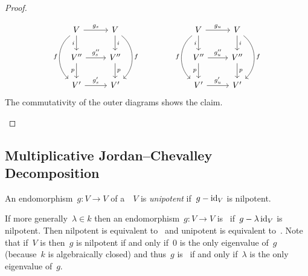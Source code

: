\begin{proof}
\begin{enumerate}
\[\begin{tikzcd}
            V
            \arrow{r}[above]{g_s}
            \arrow{d}[left]{i}
            \arrow[bend right = 50]{dd}[left]{f}
          & V
            \arrow{d}[right]{i}
            \arrow[bend left = 50]{dd}[right]{f}
          \\
            V''
            \arrow{r}[above]{g''_s}
            \arrow{d}[left]{p}
          & V''
            \arrow{d}[right]{p}
          \\
            V'
            \arrow{r}[above]{g'_s}
          & V'
        \end{tikzcd}
        \qquad
        \qquad
        \begin{tikzcd}
            V
            \arrow{r}[above]{g_u}
            \arrow{d}[left]{i}
            \arrow[bend right = 50]{dd}[left]{f}
          & V
            \arrow{d}[right]{i}
            \arrow[bend left = 50]{dd}[right]{f}
          \\
            V''
            \arrow{r}[above]{g''_u}
            \arrow{d}[left]{p}
          & V''
            \arrow{d}[right]{p}
          \\
            V'
            \arrow{r}[above]{g'_u}
          & V'
        \end{tikzcd}
      \]
      The commutativity of the outer diagrams shows the claim.
    \qedhere
  \end{enumerate}
\end{proof}









\subsection{Multiplicative Jordan--Chevalley Decomposition}


\begin{definition}
  An endomorphism~$g \colon V \to V$ of a~{\kvs}~$V$ is \emph{unipotent} if~$g - \operatorname{id}_V$ is nilpotent.
\end{definition}


\begin{remark}
  If more generally~$\lambda \in k$ then an endomorphism~$g \colon V \to V$ is~\emph{} if~$g - \lambda \operatorname{id}_V$ is nilpotent.
  Then nilpotent is equivalent to~ and unipotent is equivalent to~.
  Note that if~$V$ is {\fd} then~$g$ is nilpotent if and only if~$0$ is the only eigenvalue of~$g$ (because~$k$ is algebraically closed) and thus~$g$ is~ if and only if~$\lambda$ is the only eigenvalue of~$g$.
\end{remark}


